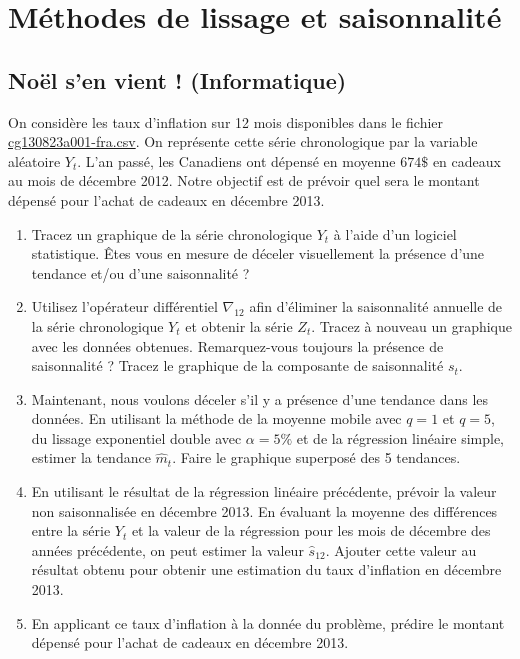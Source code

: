\documentclass[11pt,english,francais]{article}
\begin{document}


\section{Méthodes de lissage et saisonnalité}
\label{sec:serie-dexercices-1}

\subsection{Noël s'en vient ! (Informatique)}
\label{sec:exercice-1-1}

On considère les taux d'inflation sur 12 mois disponibles dans le
fichier \url{cg130823a001-fra.csv}. On représente cette série chronologique
par la variable aléatoire $Y_t$. L'an passé, les Canadiens ont dépensé
en moyenne $674\$$ en cadeaux au mois de décembre 2012. Notre objectif
est de prévoir quel sera le montant dépensé pour l'achat de cadeaux en
décembre 2013.

\begin{enumerate}
\item Tracez un graphique de la série chronologique $Y_t$ à l'aide
  d'un logiciel statistique. Êtes vous en mesure de déceler
  visuellement la présence d'une tendance et/ou d'une saisonnalité ?

\item Utilisez l'opérateur différentiel $\nabla_{12}$ afin d'éliminer
  la saisonnalité annuelle de la série chronologique $Y_t$ et obtenir
  la série $Z_t$. Tracez à nouveau un graphique avec les données
  obtenues. Remarquez-vous toujours la présence de saisonnalité ?
  Tracez le graphique de la composante de saisonnalité $s_t$.

\item Maintenant, nous voulons déceler s'il y a présence d'une
  tendance dans les données. En utilisant la méthode de la moyenne
  mobile avec $q=1$ et $q=5$, du lissage exponentiel double avec
  $\alpha=5\%$ et de la régression linéaire simple, estimer la
  tendance $\hat{m}_t$. Faire le graphique superposé des 5 tendances.

\item En utilisant le résultat de la régression linéaire précédente,
  prévoir la valeur non saisonnalisée en décembre 2013. En évaluant la
  moyenne des différences entre la série $Y_t$ et la valeur de la
  régression pour les mois de décembre des années précédente, on peut
  estimer la valeur $\hat{s}_{12}$. Ajouter cette valeur au résultat
  obtenu pour obtenir une estimation du taux d'inflation en décembre
  2013.

\item En applicant ce taux d'inflation à la donnée du problème,
  prédire le montant dépensé pour l'achat de cadeaux en décembre 2013.
\end{enumerate}
\end{document}
